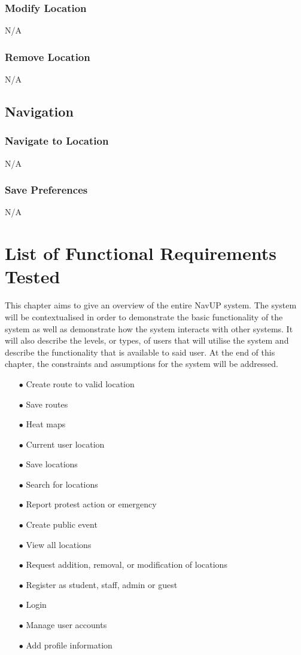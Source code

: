 \documentclass[english]{article}
\begin{document}
\subsubsection{Modify Location}
N/A
\subsubsection{Remove Location}
N/A

\subsection{Navigation}

\subsubsection{Navigate to Location}
N/A
\subsubsection{Save Preferences}
N/A


	\section{List of Functional Requirements Tested}
	This chapter aims to give an overview of the entire NavUP system. The system will be contextualised in order to demonstrate the basic functionality of the system as well as demonstrate how the system interacts with other systems. It will also describe the levels, or types, of users that will utilise the system and describe the functionality that is available to said user. At the end of this chapter, the constraints and assumptions for the system will be addressed.
	
	\begin{itemize}
		\item[$\bullet$] Create route to valid location
		\item[$\bullet$] Save routes
		\item[$\bullet$] Heat maps
		\item[$\bullet$] Current user location
		\item[$\bullet$] Save locations
		\item[$\bullet$] Search for locations
		\item[$\bullet$] Report protest action or emergency
		\item[$\bullet$] Create public event
		\item[$\bullet$] View all locations
		\item[$\bullet$] Request addition, removal, or modification of locations
		\item[$\bullet$] Register as student, staff, admin or guest
		\item[$\bullet$] Login
		\item[$\bullet$] Manage user accounts
		\item[$\bullet$] Add profile information
	\end{itemize}
	
\end{document}
